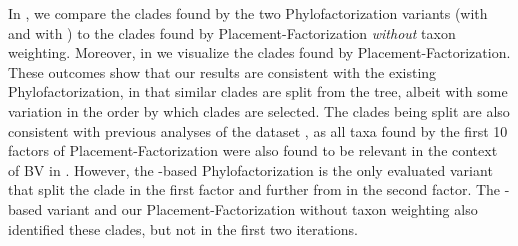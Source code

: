 In , we compare the clades found by the two Phylofactorization variants
(with  and with )
to the clades found by Placement-Factorization \emph{without} taxon weighting.
Moreover, in  we visualize the clades found by Placement-Factorization.
These outcomes show that our results are consistent with the existing Phylofactorization,
in that similar clades are split from the tree,
albeit with some variation in the order by which clades are selected. %
The clades being split are also consistent with previous analyses of the dataset \cite{Srinivasan2012},
as all taxa found by the first \num{10} factors of Placement-Factorization
were also found to be relevant in the context of \acl{BV} in \cite{Srinivasan2012}.
However, the -based Phylofactorization is the only evaluated variant
that split the  clade in the first factor
and further  from  in the second factor.
The -based variant and our Placement-Factorization without taxon weighting also identified these clades,
but not in the first two iterations.

